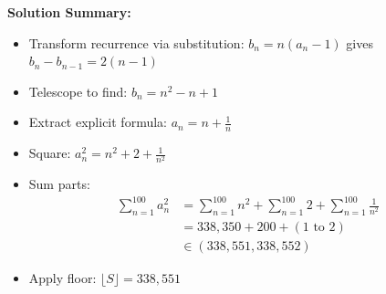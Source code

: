 \documentclass[12pt]{article}
\begin{document}
\textbf{Solution Summary:}
\begin{itemize}
    \item Transform recurrence via substitution: $b_n = n(a_n-1)$ gives $b_n - b_{n-1} = 2(n-1)$
    \item Telescope to find: $b_n = n^2 - n + 1$
    \item Extract explicit formula: $a_n = n + \frac{1}{n}$
    \item Square: $a_n^2 = n^2 + 2 + \frac{1}{n^2}$
    \item Sum parts:
    \begin{align*}
    \sum_{n=1}^{100} a_n^2 &= \sum_{n=1}^{100} n^2 + \sum_{n=1}^{100} 2 + \sum_{n=1}^{100} \frac{1}{n^2} \\
    &= 338{,}350 + 200 + (1 \text{ to } 2) \\
    &\in (338{,}551, 338{,}552)
    \end{align*}
    \item Apply floor: $\lfloor S \rfloor = 338{,}551$
\end{itemize}
\end{document}
